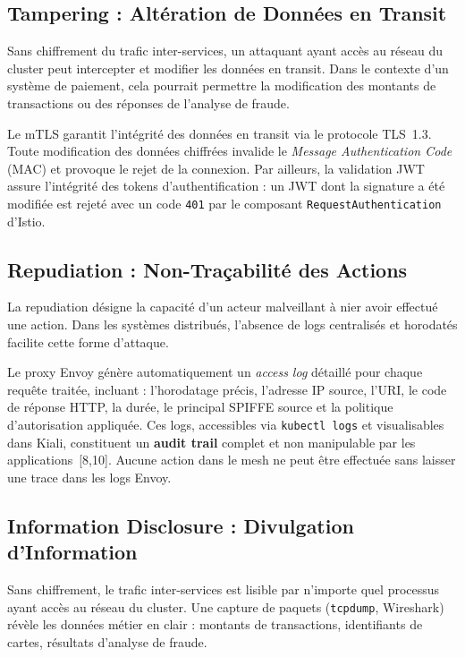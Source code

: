 \subsection{Tampering : Altération de Données en Transit}

Sans chiffrement du trafic inter-services, un attaquant ayant accès au réseau
du cluster peut intercepter et modifier les données en transit. Dans le contexte
d'un système de paiement, cela pourrait permettre la modification des montants
de transactions ou des réponses de l'analyse de fraude.

Le mTLS garantit l'intégrité des données en transit via le protocole TLS~1.3.
Toute modification des données chiffrées invalide le \textit{Message
Authentication Code} (MAC) et provoque le rejet de la connexion. Par ailleurs,
la validation JWT assure l'intégrité des tokens d'authentification : un JWT dont
la signature a été modifiée est rejeté avec un code \texttt{401} par le composant
\texttt{RequestAuthentication} d'Istio.

\subsection{Repudiation : Non-Traçabilité des Actions}

La repudiation désigne la capacité d'un acteur malveillant à nier avoir effectué
une action. Dans les systèmes distribués, l'absence de logs centralisés et
horodatés facilite cette forme d'attaque.

Le proxy Envoy génère automatiquement un \textit{access log} détaillé pour chaque
requête traitée, incluant : l'horodatage précis, l'adresse IP source, l'URI, le
code de réponse HTTP, la durée, le principal SPIFFE source et la politique
d'autorisation appliquée. Ces logs, accessibles via \texttt{kubectl logs} et
visualisables dans Kiali, constituent un \textbf{audit trail} complet et non
manipulable par les applications~[8,10]. Aucune action dans le mesh ne peut être
effectuée sans laisser une trace dans les logs Envoy.

\subsection{Information Disclosure : Divulgation d'Information}

Sans chiffrement, le trafic inter-services est lisible par n'importe quel
processus ayant accès au réseau du cluster. Une capture de paquets
(\texttt{tcpdump}, Wireshark) révèle les données métier en clair : montants de
transactions, identifiants de cartes, résultats d'analyse de fraude.

